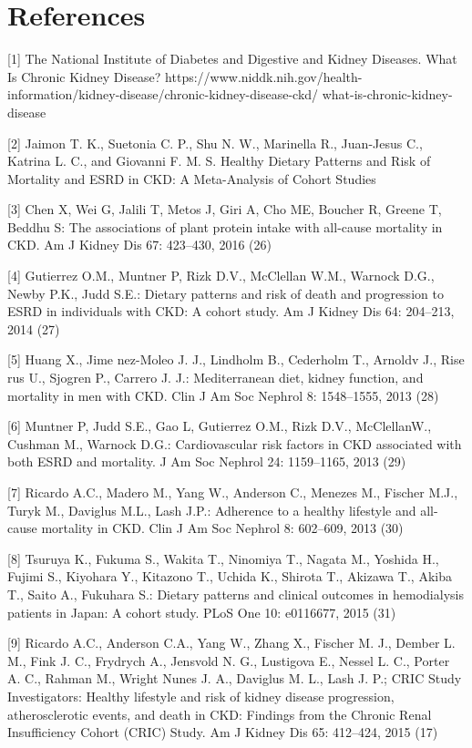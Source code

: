 \section{References}
\begin{flushleft}

[1]	The National Institute of Diabetes and Digestive and Kidney Diseases. What Is Chronic Kidney
Disease? https://www.niddk.nih.gov/health-information/kidney-disease/chronic-kidney-disease-ckd/
what-is-chronic-kidney-disease

[2]	Jaimon T. K., Suetonia C. P., Shu N. W., Marinella R., Juan-Jesus C., Katrina L. C., and Giovanni F. M. S.  Healthy Dietary Patterns and Risk of Mortality and ESRD in CKD: A Meta-Analysis of Cohort Studies 

[3]	Chen X, Wei G, Jalili T, Metos J, Giri A, Cho ME, Boucher R, Greene T, Beddhu S: The associations of plant protein intake with all-cause mortality in CKD. Am J Kidney Dis 67: 423–430, 2016 (26)

[4]	Gutierrez O.M., Muntner P, Rizk D.V., McClellan W.M., Warnock D.G., Newby P.K., Judd S.E.: Dietary patterns and risk of death and progression to ESRD in individuals with CKD: A cohort study. Am J Kidney Dis 64: 204–213, 2014  (27)

[5]	Huang X., Jime nez-Moleo J. J., Lindholm B., Cederholm T., Arnoldv J., Rise rus U., Sjogren P., Carrero J. J.: Mediterranean diet, kidney function, and mortality in men with CKD. Clin J Am Soc Nephrol 8: 1548–1555, 2013 (28)

[6]	Muntner P, Judd S.E., Gao L, Gutierrez O.M., Rizk D.V., McClellanW., Cushman M., Warnock D.G.: Cardiovascular risk factors in CKD associated with both ESRD and mortality. J Am Soc Nephrol 24: 1159–1165, 2013 (29)

[7]	Ricardo A.C., Madero M., Yang W., Anderson C., Menezes M., Fischer M.J., Turyk M., Daviglus M.L., Lash J.P.: Adherence to a healthy lifestyle and all-cause mortality in CKD. Clin J Am Soc Nephrol 8: 602–609, 2013 (30)

[8]	Tsuruya K., Fukuma S., Wakita T., Ninomiya T., Nagata M., Yoshida H., Fujimi S., Kiyohara Y., Kitazono T., Uchida K., Shirota T., Akizawa T., Akiba T., Saito A., Fukuhara S.: Dietary patterns and clinical outcomes in hemodialysis patients in Japan: A cohort study. PLoS One 10: e0116677, 2015 (31)

[9]	Ricardo A.C., Anderson C.A., Yang W., Zhang X., Fischer M. J., Dember L. M., Fink J. C., Frydrych A., Jensvold N. G., Lustigova E., Nessel L. C., Porter A. C., Rahman M., Wright Nunes J. A., Daviglus M. L., Lash J. P.; CRIC Study Investigators: Healthy lifestyle and risk of kidney disease progression, atherosclerotic events, and death in CKD: Findings from the Chronic Renal Insufficiency Cohort (CRIC) Study. Am J Kidney Dis 65: 412–424, 2015 (17)


\end{flushleft}
